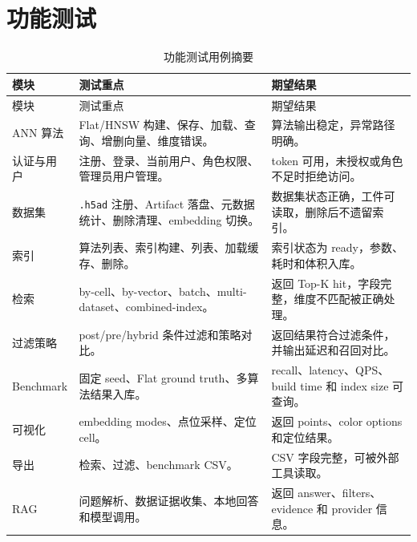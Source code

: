 \documentclass[UTF8,a4paper,12pt]{ctexrep}
\begin{document}
\section{功能测试}

\begin{longtable}{L{0.22\textwidth}L{0.32\textwidth}L{0.36\textwidth}}
  \caption{功能测试用例摘要} \\
  \toprule
  模块 & 测试重点 & 期望结果 \\
  \midrule
  \endfirsthead
  \toprule
  模块 & 测试重点 & 期望结果 \\
  \midrule
  \endhead
  ANN 算法 & Flat/HNSW 构建、保存、加载、查询、增删向量、维度错误。 & 算法输出稳定，异常路径明确。 \\
  认证与用户 & 注册、登录、当前用户、角色权限、管理员用户管理。 & token 可用，未授权或角色不足时拒绝访问。 \\
  数据集 & \texttt{.h5ad} 注册、Artifact 落盘、元数据统计、删除清理、embedding 切换。 & 数据集状态正确，工件可读取，删除后不遗留索引。 \\
  索引 & 算法列表、索引构建、列表、加载缓存、删除。 & 索引状态为 ready，参数、耗时和体积入库。 \\
  检索 & by-cell、by-vector、batch、multi-dataset、combined-index。 & 返回 Top-K hit，字段完整，维度不匹配被正确处理。 \\
  过滤策略 & post/pre/hybrid 条件过滤和策略对比。 & 返回结果符合过滤条件，并输出延迟和召回对比。 \\
  Benchmark & 固定 seed、Flat ground truth、多算法结果入库。 & recall、latency、QPS、build time 和 index size 可查询。 \\
  可视化 & embedding modes、点位采样、定位 cell。 & 返回 points、color options 和定位结果。 \\
  导出 & 检索、过滤、benchmark CSV。 & CSV 字段完整，可被外部工具读取。 \\
  RAG & 问题解析、数据证据收集、本地回答和模型调用。 & 返回 answer、filters、evidence 和 provider 信息。 \\
  \bottomrule
\end{longtable}
\end{document}
